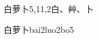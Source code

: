 \begin{entry}{白萝卜}{5,11,2}{⽩、⾋、⼘}
  \begin{phonetics}{白萝卜}{bai2luo2bo5}
  \end{phonetics}
\end{entry}
